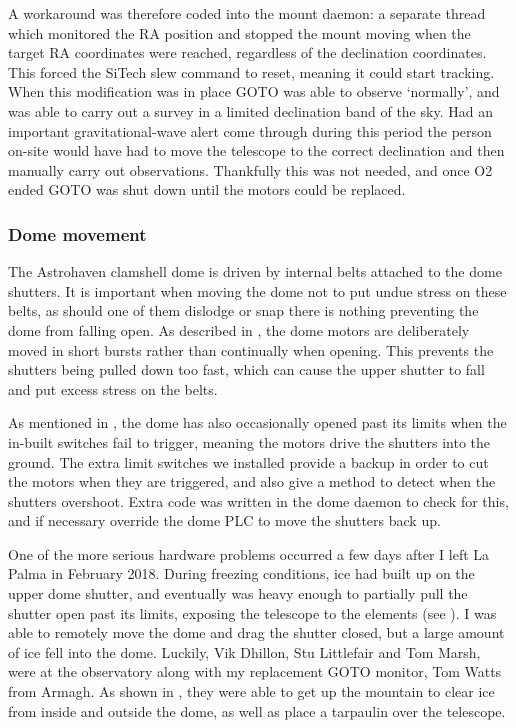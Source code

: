 \begin{colsection}
\begin{colsection}
A workaround was therefore coded into the mount daemon: a separate thread which monitored the RA position and stopped the mount moving when the target RA coordinates were reached, regardless of the declination coordinates. This forced the SiTech slew command to reset, meaning it could start tracking. When this modification was in place GOTO was able to observe `normally', and was able to carry out a survey in a limited declination band of the sky. Had an important gravitational-wave alert come through during this period the person on-site would have had to move the telescope to the correct declination and then manually carry out observations. Thankfully this was not needed, and once O2 ended GOTO was shut down until the motors could be replaced.

\subsubsection{Dome movement}

The Astrohaven clamshell dome is driven by internal belts attached to the dome shutters. It is important when moving the dome not to put undue stress on these belts, as should one of them dislodge or snap there is nothing preventing the dome from falling open. As described in , the dome motors are deliberately moved in short bursts rather than continually when opening. This prevents the shutters being pulled down too fast, which can cause the upper shutter to fall and put excess stress on the belts.

As mentioned in , the dome has also occasionally opened past its limits when the in-built switches fail to trigger, meaning the motors drive the shutters into the ground. The extra limit switches we installed provide a backup in order to cut the motors when they are triggered, and also give a method to detect when the shutters overshoot. Extra code was written in the dome daemon to check for this, and if necessary override the dome PLC to move the shutters back up.

One of the more serious hardware problems occurred a few days after I left La Palma in February 2018. During freezing conditions, ice had built up on the upper dome shutter, and eventually was heavy enough to partially pull the shutter open past its limits, exposing the telescope to the elements (see ). I was able to remotely move the dome and drag the shutter closed, but a large amount of ice fell into the dome. Luckily, Vik Dhillon, Stu Littlefair and Tom Marsh, were at the observatory along with my replacement GOTO monitor, Tom Watts from Armagh. As shown in , they were able to get up the mountain to clear ice from inside and outside the dome, as well as place a tarpaulin over the telescope.


\end{colsection}
\end{colsection}
